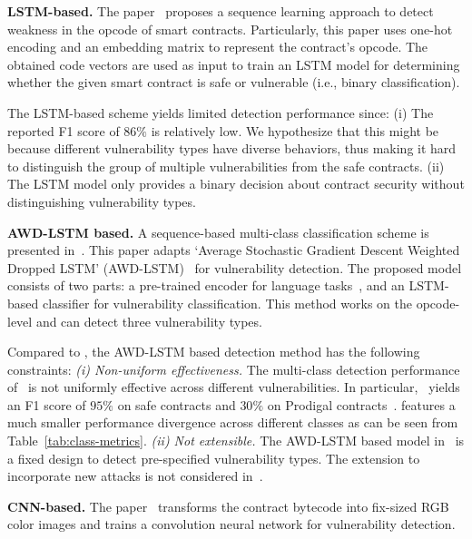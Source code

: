 \vspace{0.2em}
\textbf{LSTM-based.}
The paper~\cite{rw_lstm} proposes a sequence learning approach to detect weakness in the opcode of smart contracts. 
Particularly, this paper uses one-hot encoding and an embedding matrix to represent the contract's opcode. 
The obtained code vectors are used as input to train an LSTM model for determining whether the given smart contract is safe or vulnerable (i.e., binary classification). 

The LSTM-based scheme yields limited detection performance since: (i) The reported F1 score of $86\%$ is relatively low. We hypothesize that this might be because different vulnerability types have diverse behaviors, thus making it hard to distinguish the group of multiple vulnerabilities from the safe contracts. (ii) The LSTM model only provides a binary decision about contract security without distinguishing vulnerability types.

\textbf{AWD-LSTM based.} A sequence-based multi-class classification scheme is presented in~\cite{gogineni2020multi}. This paper adapts `Average Stochastic Gradient Descent Weighted Dropped LSTM' (AWD-LSTM)~\cite{merity2017regularizing} for vulnerability detection. 
The proposed model consists of two parts: a pre-trained encoder for language tasks~\cite{howard2018universal}, and an LSTM-based classifier for vulnerability classification. 
This method works on the opcode-level and can detect three vulnerability types. 

Compared to \sys{}, the AWD-LSTM based detection method has the following constraints: \textit{(i) Non-uniform effectiveness.} The multi-class detection performance of~\cite{gogineni2020multi} is not uniformly effective across different vulnerabilities. In particular,~\cite{gogineni2020multi} yields an F1 score of $95\%$ on safe contracts and $30\%$ on Prodigal contracts~\cite{nikolic2018finding}. \sys{} features a much smaller performance divergence across different classes as can be seen from Table~\ref{tab:class-metrics}. \textit{(ii) Not extensible.} The AWD-LSTM based model in~\cite{gogineni2020multi} is a fixed design to detect pre-specified vulnerability types. The extension to incorporate new attacks is not considered in~\cite{gogineni2020multi}.

\vspace{0.1em}
\textbf{CNN-based.} 
The paper~\cite{huang2018hunting} transforms the contract bytecode into fix-sized RGB color images and trains a convolution neural network for vulnerability detection. 

